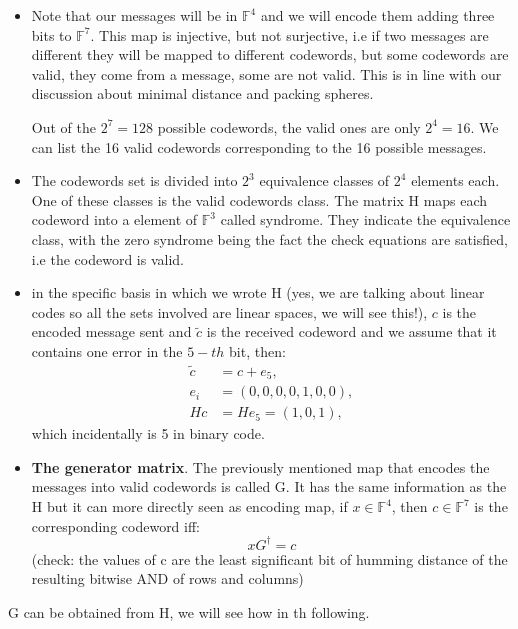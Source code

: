 \begin{itemize}
	\item Note that our messages will be in $\mathbb{F}^4$ and we will encode them adding three bits to $\mathbb{F}^7$. This map is injective, but not surjective, i.e if two messages are different they will be mapped to different codewords, but some codewords are valid, they come from a message, some are not valid. This is in line with our discussion about minimal distance and packing spheres. 
	
	Out of the $2^7=128$ possible codewords, the valid ones are only $2^4=16$. We can list the 16 valid codewords corresponding to the 16 possible messages.
	
	\item The codewords set is divided into $2^3$ equivalence classes of $2^4$ elements each. One of these classes is the valid codewords class. The matrix H maps each codeword into a element of $\mathbb{F}^3$ called syndrome. They indicate the equivalence class, with the zero syndrome being the fact the check equations are satisfied, i.e the codeword is valid.
	\item in the specific basis in which we wrote H (yes, we are talking about linear codes so all the sets involved are linear spaces, we will see this!), $c$ is the encoded message sent and $\tilde{c}$ is the received codeword and we assume that it contains one error in the $5-th$ bit, then:
	\begin{equation}
	\begin{split}
	\tilde{c} &= c + e_5, \\
	e_i &= (0, 0, 0, 0, 1, 0, 0), \\
	Hc &= He_5 = (1, 0, 1), 
	\end{split}
	\end{equation} 
which incidentally is 5 in binary code.
 \item \textbf{The generator matrix}. The previously mentioned map that encodes the messages into valid codewords is called G. It has the same information as the H but it can more directly seen as encoding map, if $x \in \mathbb{F}^4$, then $c \in \mathbb{F}^7$ is the corresponding codeword iff:
 \begin{equation}
	 x G^\dagger=c
 \end{equation}
(check: the values of c are the least significant bit of humming distance of the resulting bitwise AND of rows and columns)
\end{itemize}
G can be obtained from H, we will see how in th following.


